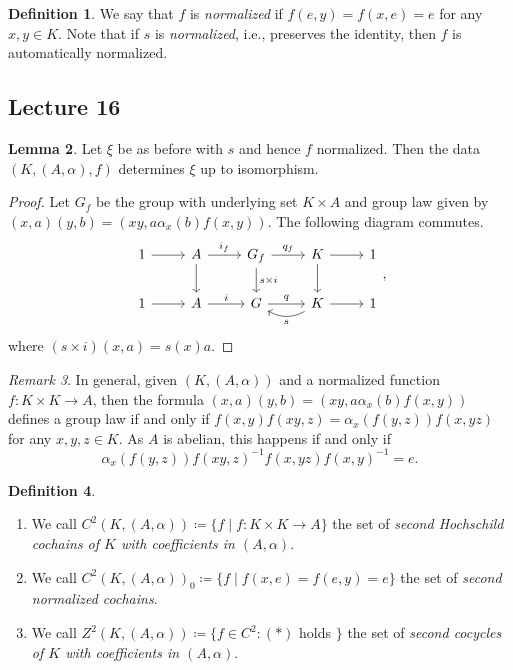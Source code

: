 \documentclass[10pt,letterpaper,cm]{nupset}
\theoremstyle{definition}
\newtheorem{definition}{Definition}[subsection]
\theoremstyle{theorem}
\newtheorem{lemma}[definition]{Lemma}
\theoremstyle{remark}
\newtheorem{remark}[definition]{Remark}
\newcommand{\1}{\mathbf{1}}
\newcommand{\0}{\vec 0}
\begin{document}
\begin{definition}
We say that $f$ is \textit{normalized} if $f(e, y) = f(x, e) =e$ for any $x,y \in K$. Note that if $s$ is \textit{normalized}, i.e., preserves the identity, then $f$ is automatically normalized.
\end{definition}

\subsection{Lecture 16}

\begin{lemma} 
Let $\xi$ be as before with $s$ and hence $f$ normalized. Then the data $(K, (A, \alpha), f)$ determines $\xi$ up to isomorphism.
\end{lemma}
\begin{proof}
Let $G_f$ be the group with underlying set $K \times A$ and group law given by $(x, a)(y, b) = (xy, a \alpha_x(b)f(x,y))$. The following diagram commutes.
\[
\begin{tikzcd}
1 \arrow[r] & A \arrow[r, "i_f"] \arrow[d] & G_f \arrow[d, "s\times i"] \arrow[r, "q_f"] & K \arrow[r] \arrow[d] & 1 \\
1 \arrow[r] & A \arrow[r, "i"] & G \arrow[r, "q"] & K \arrow[r] \arrow[l, "s", bend left] & 1
\end{tikzcd},
\]
where $(s\times i)(x, a) = s(x)a$.
\end{proof}

\begin{remark}\label{lr}
In general, given $(K, (A, \alpha))$ and a normalized function $f: K \times K \to A$, then the formula $(x, a)(y, b) = (xy, a \alpha_x(b)f(x,y))$ defines a group law if and only if $f(x,y)f(xy, z) = \alpha_x(f(y,z))f(x, yz)$ for any $x, y, z \in K$. As $A$ is abelian, this happens if and only if  
\[ 
\tag{$\ast$}\alpha_x(f(y, z))f(xy, z)^{-1} f(x, yz)f(x, y)^{-1} = e.
\]
\end{remark}

\begin{definition} $ $
\begin{enumerate}
\item We call $C^2(K, (A, \alpha))\coloneqq  \{f \mid f: K \times K \to A\}$ the set of \textit{second Hochschild cochains of $K$ with coefficients in $(A, \alpha)$}. 
\item We call $C^2(K, (A, \alpha))_0 \coloneqq  \{f \mid f(x, e) = f(e, y) =e\}$ the set of \textit{second normalized cochains}.
\item We call $Z^2(K, (A, \alpha)) \coloneqq  \{f \in C^2 : (\ast)$ holds $\}$ the set of \textit{second cocycles of $K$ with coefficients in $(A, \alpha)$}.
\end{enumerate}
\end{definition}
\end{document}
